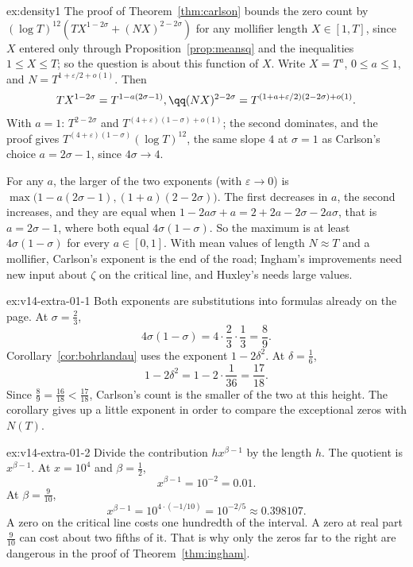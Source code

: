 \begin{solution}{ex:density1}
\idea The proof of Theorem~\ref{thm:carlson} bounds the zero count by $(\log T)^{12}(TX^{1-2\sigma}+(NX)^{2-2\sigma})$ for any mollifier length $X\in[1,T]$, since $X$ entered only through Proposition~\ref{prop:meansq} and the inequalities $1\le X\le T$; so the question is about this function of $X$.
\writeup Write $X=T^a$, $0\le a\le1$, and $N=T^{1+\varepsilon/2+o(1)}$. Then
\[
\begin{gathered}TX^{1-2\sigma}=T^{1-a(2\sigma-1)},\qq(NX)^{2-2\sigma}=T^{(1+a+\varepsilon/2)(2-2\sigma)+o(1)}.\end{gathered}
\] With $a=1$: $T^{2-2\sigma}$ and $T^{(4+\varepsilon)(1-\sigma)+o(1)}$; the second dominates, and the proof gives $T^{(4+\varepsilon)(1-\sigma)}(\log T)^{12}$, the same slope $4$ at $\sigma=1$ as Carlson's choice
$a=2\sigma-1$, since $4\sigma\to4$.

For any $a$, the larger of the two exponents (with $\varepsilon\to0$) is $\max\bigl(1-a(2\sigma-1),(1+a)(2-2\sigma)\bigr)$. The first decreases in $a$, the second increases, and they are equal when $1-2a\sigma+a=2+2a-2\sigma-2a\sigma$, that is $a=2\sigma-1$, where both equal $4\sigma(1-\sigma)$. So the maximum is at least $4\sigma(1-\sigma)$ for every $a\in[0,1]$. With mean values of length $N\approx T$ and a mollifier, Carlson's exponent is the end of the road; Ingham's improvements need new input about $\zeta$ on the critical line, and Huxley's needs large values.
\end{solution}

\begin{solution}{ex:v14-extra-01-1}
\idea Both exponents are substitutions into formulas already on the page.
\writeup At $\sigma=\frac23$,
\[
4\sigma(1-\sigma)=4\cdot\frac23\cdot\frac13=\frac89.
\]
Corollary~\ref{cor:bohrlandau} uses the exponent $1-2\delta^2$. At $\delta=\frac16$,
\[
1-2\delta^2=1-2\cdot\frac1{36}=\frac{17}{18}.
\]
Since $\frac89=\frac{16}{18}<\frac{17}{18}$, Carlson's count is the smaller of the two at this height. The corollary gives up a little exponent in order to compare the exceptional zeros with $N(T)$.
\end{solution}

\begin{solution}{ex:v14-extra-01-2}
\idea Divide the contribution $hx^{\beta-1}$ by the length $h$.
\writeup The quotient is $x^{\beta-1}$. At $x=10^4$ and $\beta=\frac12$,
\[
x^{\beta-1}=10^{-2}=0.01.
\]
At $\beta=\frac9{10}$,
\[
x^{\beta-1}=10^{4\cdot(-1/10)}=10^{-2/5}\approx0.398107.
\]
A zero on the critical line costs one hundredth of the interval. A zero at real part $\frac9{10}$ can cost about two fifths of it. That is why only the zeros far to the right are dangerous in the proof of Theorem~\ref{thm:ingham}.
\end{solution}

